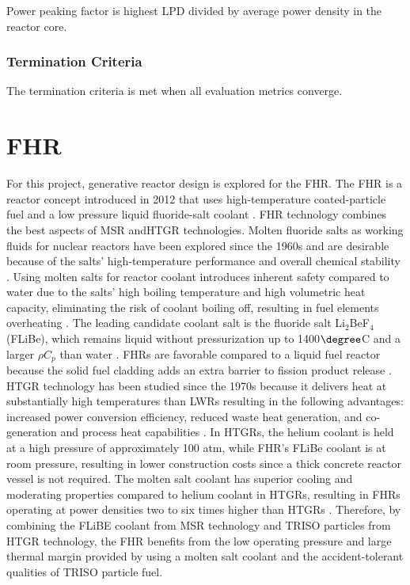 Power peaking factor is highest \gls{LPD} divided by average power density in 
the reactor core. 

\subsubsection{Termination Criteria}
The termination criteria is met when all evaluation metrics converge. 

\section{\gls{FHR}}
For this project, generative reactor design is explored for the 
\gls{FHR}. 
The \gls{FHR} is a reactor concept introduced in 2012 that uses high-temperature 
coated-particle fuel and a low pressure liquid fluoride-salt coolant 
\cite{forsberg_fluoride-salt-cooled_2012,facilitators_fluoride-salt-cooled_2013}.
\gls{FHR} technology combines the best aspects of \gls{MSR} and\gls{HTGR} 
technologies. 
Molten fluoride salts as working fluids for nuclear reactors have been explored 
since the 1960s and are desirable because of the salts' high-temperature 
performance and overall chemical stability \cite{scarlat_design_2014}.  
Using molten salts for reactor coolant introduces inherent safety compared 
to water due to the salts' high boiling temperature and high volumetric 
heat capacity, eliminating the risk of coolant boiling off, resulting in 
fuel elements overheating \cite{ho_molten_2013}. 
The leading candidate coolant salt is the fluoride salt Li$_2$BeF$_4$ (FLiBe), 
which remains liquid without pressurization up to 1400$\degree$C and a larger 
$\rho C_p$ than water \cite{ho_molten_2013,forsberg_fluoride-salt-cooled_2012}. 
\glspl{FHR} are favorable compared to a liquid fuel reactor because the solid 
fuel cladding adds an extra barrier to fission product release 
\cite{ho_molten_2013}.
\gls{HTGR} technology has been studied since the 1970s because it delivers 
heat at substantially high temperatures than \glspl{LWR} resulting in 
the following advantages: increased power conversion efficiency, reduced 
waste heat generation, and co-generation and process heat capabilities 
\cite{scarlat_design_2014}. 
In \glspl{HTGR}, the helium coolant is held at a high pressure of approximately 
100 atm, while \gls{FHR}'s FLiBe coolant is at room pressure, resulting in lower 
construction costs since a thick concrete reactor vessel is not required.
The molten salt coolant has superior cooling and moderating properties compared 
to helium coolant in \glspl{HTGR}, resulting in \glspl{FHR} operating at 
power densities two to six times higher than  \glspl{HTGR} 
\cite{scarlat_design_2014,forsberg_fluoride-salt-cooled_2012}.
Therefore, by combining the FLiBE coolant from \gls{MSR} technology and 
\gls{TRISO} particles from \gls{HTGR} technology, the \gls{FHR} benefits from 
the low operating pressure and large thermal margin provided by using a molten 
salt coolant and the accident-tolerant qualities of \gls{TRISO} particle fuel. 

